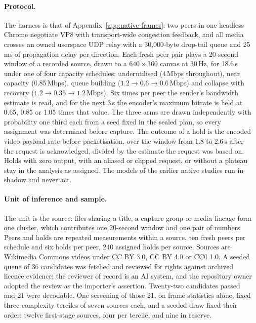 \paragraph{Protocol.}
The harness is that of Appendix~\ref{app:native-frames}: two peers in one headless Chrome negotiate VP8 with transport-wide congestion feedback, and all media crosses an owned userspace UDP relay with a 30{,}000-byte drop-tail queue and 25\,ms of propagation delay per direction. Each fresh peer pair plays a 20-second window of a recorded source, drawn to a $640\times360$ canvas at 30\,Hz, for 18.6\,s under one of four capacity schedules: underutilised (4\,Mbps throughout), near capacity (0.85\,Mbps), queue building ($1.2\to0.6\to0.6$\,Mbps) and collapse with recovery ($1.2\to0.35\to1.2$\,Mbps). Six times per peer the sender's bandwidth estimate is read, and for the next 3\,s the encoder's maximum bitrate is held at 0.65, 0.85 or 1.05 times that value. The three arms are drawn independently with probability one third each from a seed fixed in the sealed plan, so every assignment was determined before capture. The outcome of a hold is the encoded video payload rate before packetisation, over the window from 1.8 to 2.6\,s after the request is acknowledged, divided by the estimate the request was based on. Holds with zero output, with an aliased or clipped request, or without a plateau stay in the analysis as assigned. The models of the earlier native studies run in shadow and never act.

\paragraph{Unit of inference and sample.}
The unit is the source: files sharing a title, a capture group or media lineage form one cluster, which contributes one 20-second window and one pair of numbers. Peers and holds are repeated measurements within a source, ten fresh peers per schedule and six holds per peer, 240 assigned holds per source. Sources are Wikimedia Commons videos under CC BY 3.0, CC BY 4.0 or CC0 1.0. A seeded queue of 36 candidates was fetched and reviewed for rights against archived licence evidence; the reviewer of record is an AI system, and the repository owner adopted the review as the importer's assertion. Twenty-two candidates passed and 21 were decodable. One screening of those 21, on frame statistics alone, fixed three complexity terciles of seven sources each, and a seeded draw fixed their order: twelve first-stage sources, four per tercile, and nine in reserve.

